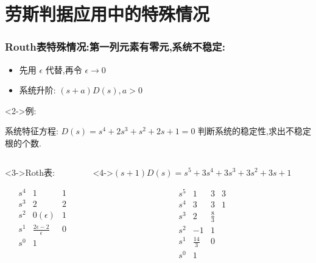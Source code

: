 \documentclass{beamer}
\begin{document}
\section{劳斯判据应用中的特殊情况}
\label{sec-4}
\begin{frame}
\frametitle{Routh表特殊情况:第一列元素有零元,系统不稳定:}
\label{sec-4-1}

\begin{itemize}
\item 先用 $\epsilon$ 代替,再令 $\epsilon\rightarrow 0$
\item 系统升阶: $(s+a)D(s),a>0$
\end{itemize}
\begin{block}<2->{例:}
\label{sec-4-1-1}

系统特征方程: $D(s)=s^{4}+2s^{3}+s^{2}+2s+1=0$ 判断系统的稳定性,求出不稳定根的个数.
\end{block}
\begin{columns}
\begin{column}{0.3\textwidth}
\begin{block}<3->{Roth表:}
\label{sec-4-1-2}


\[
\begin{matrix}
s^{4}   &  1  &   1  \\
s^{3}   &  2  &  2   \\
s^{2}   &  0(\epsilon)  &  1   \\
s^{1}   &  \frac{2\epsilon-2}{\epsilon} & 0 \\
s^{0}   &  1   \\
\end{matrix}
\]
\end{block}
\end{column}
\begin{column}{0.7\textwidth}
\begin{block}<4->{$(s+1)D(s)=s^{5}+3s^{4}+3s^{3}+3s^{2}+3s+1$}
\label{sec-4-1-3}


\[
\begin{matrix}
s^{5} & 1 & 3 & 3 \\
s^{4} & 3 & 3 & 1 \\
s^{3} & 2 & \frac{8}{3} \\
s^{2} & -1 & 1 \\
s^{1} & \frac{14}{3} & 0 \\
s^{0} & 1
\end{matrix}
\]
\end{block}
\end{column}
\end{columns}
\end{frame}
\end{document}
